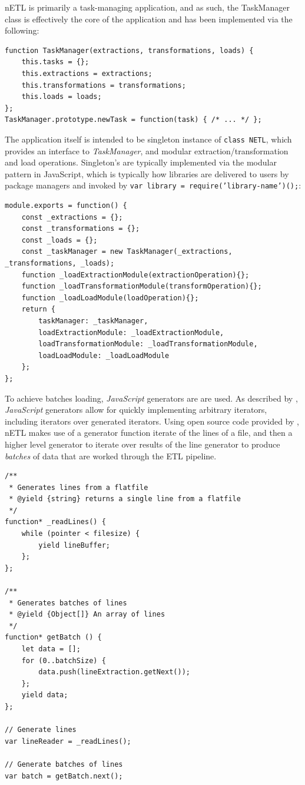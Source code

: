nETL is primarily a task-managing application, and as such, the TaskManager class is effectively the core of the application and has been implemented via the following:

\begin{verbatim}
function TaskManager(extractions, transformations, loads) {
    this.tasks = {};
    this.extractions = extractions;
    this.transformations = transformations;
    this.loads = loads;
};
TaskManager.prototype.newTask = function(task) { /* ... */ };
\end{verbatim}

The application itself is intended to be singleton instance of \texttt{class NETL{}}, which provides an interface to \textit{TaskManager}, and modular extraction/transformation and load operations. Singleton's are typically implemented via the modular pattern in JavaScript, which is typically how libraries are delivered to users by package managers and invoked by \texttt{var library = require('library-name')();}:

\begin{verbatim}
module.exports = function() {
    const _extractions = {};
    const _transformations = {};
    const _loads = {};        
    const _taskManager = new TaskManager(_extractions, _transformations, _loads);
    function _loadExtractionModule(extractionOperation){};
    function _loadTransformationModule(transformOperation){};
    function _loadLoadModule(loadOperation){};
    return {
        taskManager: _taskManager,
        loadExtractionModule: _loadExtractionModule,
        loadTransformationModule: _loadTransformationModule,
        loadLoadModule: _loadLoadModule
    };
};
\end{verbatim}

To achieve batches loading, \textit{JavaScript} generators are are used. As described by \cite{mozillaGenerators}, \textit{JavaScript} generators allow for quickly implementing arbitrary iterators, including iterators over generated iterators. Using open source code provided by \cite{bower16}, nETL makes use of a generator function iterate of the lines of a file, and then a higher level generator to iterate over results of the line generator to produce \textit{batches} of data that are worked through the ETL pipeline.

\begin{verbatim}
/**
 * Generates lines from a flatfile
 * @yield {string} returns a single line from a flatfile
 */
function* _readLines() {
    while (pointer < filesize) {
        yield lineBuffer;
    };
};

/**
 * Generates batches of lines
 * @yield {Object[]} An array of lines
 */
function* getBatch () {
    let data = [];
    for (0..batchSize) {
        data.push(lineExtraction.getNext());
    };
    yield data;
};

// Generate lines
var lineReader = _readLines();

// Generate batches of lines
var batch = getBatch.next();
\end{verbatim}

